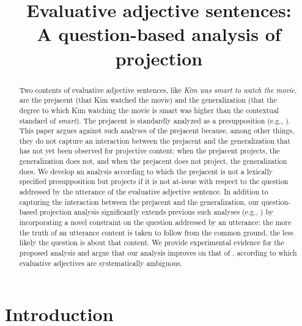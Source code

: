 \documentclass[11pt,fleqn]{article}
\title{Evaluative adjective sentences: \\ A question-based analysis of projection}
\author{}
\newcommand{\6}{\mbox{$[\hspace*{-.6mm}[$}}
\newcommand{\9}{\mbox{$]\hspace*{-.6mm}]$}}
\begin{document}
\maketitle

\vspace*{-.7cm}


\begin{abstract}

Two contents of evaluative adjective sentences, like {\em Kim was smart to watch the movie}, are the prejacent (that Kim watched the movie) and the generalization (that the degree to which Kim watching the movie is smart was higher than the contextual standard of {\em smart}). The prejacent is standardly analyzed as a presupposition
(e.g., \citealt{norrick78,barker02,oshima09b,kertz2010}). This paper argues against such analyses of the prejacent because, among other things, they do not capture an interaction between the prejacent and the generalization that has not yet been observed for projective content: when the prejacent projects, the generalization does not, and when the prejacent does not project, the generalization does. We develop an analysis according to which the prejacent is not a lexically specified presupposition but projects if it is not at-issue with respect to the question addressed by the utterance of the evaluative adjective sentence. In addition to capturing the interaction between the prejacent and the generalization, our question-based projection analysis significantly extends previous such analyses (e.g., \citealt{beaver-clark08,best-question,brst-ar}) by incorporating a novel constraint on the question addressed by an utterance: the more the truth of an utterance content is taken to follow from the common ground, the less likely the question is about that content. We provide experimental evidence for the proposed analysis and argue that our analysis improves on that of \citealt{karttunen-etal2014}, according to which evaluative adjectives are systematically ambiguous. 

\end{abstract}


\section{Introduction}\label{s1}
\end{document}
